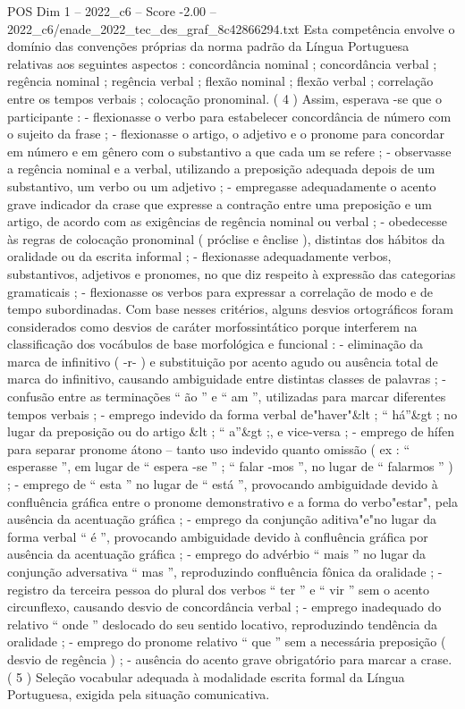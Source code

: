 \begin{textsample}{POS Dim 1 – 2022\_c6 – Score -2.00 – 2022\_c6/enade\_2022\_tec\_des\_graf\_8c42866294.txt}
Esta competência envolve o domínio das convenções próprias da norma padrão da Língua Portuguesa relativas aos seguintes aspectos : concordância nominal ; concordância verbal ; regência nominal ; regência verbal ; flexão nominal ; flexão verbal ; correlação entre os tempos verbais ; colocação pronominal. ( 4 ) Assim, esperava -se que o participante : - flexionasse o verbo para estabelecer concordância de número com o sujeito da frase ; - flexionasse o artigo, o adjetivo e o pronome para concordar em número e em gênero com o substantivo a que cada um se refere ; - observasse a regência nominal e a verbal, utilizando a preposição adequada depois de um substantivo, um verbo ou um adjetivo ; - empregasse adequadamente o acento grave indicador da crase que expresse a contração entre uma preposição e um artigo, de acordo com as exigências de regência nominal ou verbal ; - obedecesse às regras de colocação pronominal ( próclise e ênclise ), distintas dos hábitos da oralidade ou da escrita informal ; - flexionasse adequadamente verbos, substantivos, adjetivos e pronomes, no que diz respeito à expressão das categorias gramaticais ; - flexionasse os verbos para expressar a correlação de modo e de tempo subordinadas.
Com base nesses critérios, alguns desvios ortográficos foram considerados como desvios de caráter morfossintático porque interferem na classificação dos vocábulos de base morfológica e funcional : - eliminação da marca de infinitivo ( -r- ) e substituição por acento agudo ou ausência total de marca do infinitivo, causando ambiguidade entre distintas classes de palavras ; - confusão entre as terminações “ ão ” e “ am ”, utilizadas para marcar diferentes tempos verbais ; - emprego indevido da forma verbal de"haver"\&lt ; “ há”\&gt ; no lugar da preposição ou do artigo \&lt ; “ a”\&gt ;, e vice-versa ; - emprego de hífen para separar pronome átono – tanto uso indevido quanto omissão ( ex : “ esperasse ”, em lugar de “ espera -se ” ; “ falar -mos ”, no lugar de “ falarmos ” ) ; - emprego de “ esta ” no lugar de “ está ”, provocando ambiguidade devido à confluência gráfica entre o pronome demonstrativo e a forma do verbo"estar", pela ausência da acentuação gráfica ; - emprego da conjunção aditiva"e"no lugar da forma verbal “ é ”, provocando ambiguidade devido à confluência gráfica por ausência da acentuação gráfica ; - emprego do advérbio “ mais ” no lugar da conjunção adversativa “ mas ”, reproduzindo confluência fônica da oralidade ; - registro da terceira pessoa do plural dos verbos “ ter ” e “ vir ” sem o acento circunflexo, causando desvio de concordância verbal ; - emprego inadequado do relativo “ onde ” deslocado do seu sentido locativo, reproduzindo tendência da oralidade ; - emprego do pronome relativo “ que ” sem a necessária preposição ( desvio de regência ) ; - ausência do acento grave obrigatório para marcar a crase. ( 5 ) Seleção vocabular adequada à modalidade escrita formal da Língua Portuguesa, exigida pela situação comunicativa.

\end{textsample}
